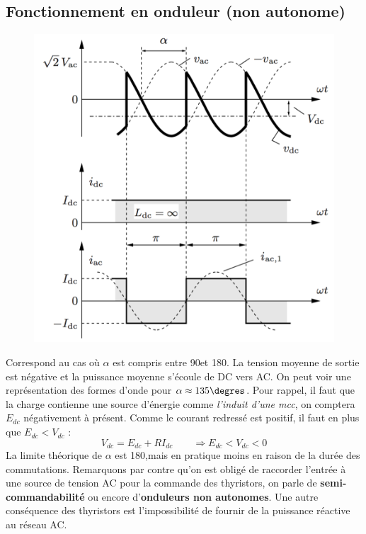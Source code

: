 					\newpage
					
			\subsection{Fonctionnement en onduleur (non autonome)}
				\begin{figure}
				\vspace{-5mm}
				\includegraphics[scale=0.28]{ch3/9}
				\end{figure}
				Correspond au cas où $\alpha$ est compris entre 90\degres et 180\degres . La tension moyenne de sortie est négative et la puissance moyenne s'écoule de DC vers AC. On peut voir une représentation des formes d'onde pour $\alpha \approx 135\degres$. Pour rappel, il faut que la charge contienne une source d'énergie comme \textit{l'induit d'une mcc}, on comptera $E_{dc}$ négativement à présent. Comme le courant redressé est positif, il faut en plus que $E_{dc}<V_{dc}$ :
				\begin{equation}
					V_{dc} = E_{dc} + RI_{dc} \qquad \Rightarrow E_{dc} < V_{dc} < 0 
				\end{equation}
				La limite théorique de $\alpha$ est 180\degres ,mais en pratique moins en raison de la durée des commutations. Remarquons par contre qu'on est obligé de raccorder l'entrée à une source de tension AC pour la commande des thyristors, on parle de \textbf{semi-commandabilité} ou encore d'\textbf{onduleurs non autonomes}. Une autre conséquence des thyristors est l'impossibilité de fournir de la puissance réactive au réseau AC. 
				

